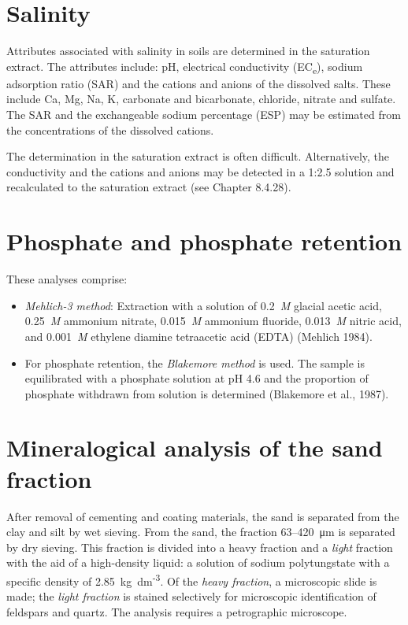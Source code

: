 \documentclass[
  letterpaper,
  DIV=11,
  numbers=noendperiod]{scrreprt}
\begin{document}
\hypertarget{salinity}{%
\section{Salinity}\label{salinity}}

Attributes associated with salinity in soils are determined in the
saturation extract. The attributes include: pH, electrical conductivity
(EC\textsubscript{e}), sodium adsorption ratio (SAR) and the cations and
anions of the dissolved salts. These include Ca, Mg, Na, K, carbonate
and bicarbonate, chloride, nitrate and sulfate. The SAR and the
exchangeable sodium percentage (ESP) may be estimated from the
concentrations of the dissolved cations.

The determination in the saturation extract is often difficult.
Alternatively, the conductivity and the cations and anions may be
detected in a 1:2.5 solution and recalculated to the saturation extract
(see Chapter 8.4.28).

\hypertarget{phosphate-and-phosphate-retention}{%
\section{Phosphate and phosphate
retention}\label{phosphate-and-phosphate-retention}}

These analyses comprise:

\begin{itemize}
\item
  \emph{Mehlich-3 method}: Extraction with a solution of 0.2~\emph{M}
  glacial acetic acid, 0.25~\emph{M} ammonium nitrate, 0.015~\emph{M}
  ammonium fluoride, 0.013~\emph{M} nitric acid, and 0.001~\emph{M}
  ethylene diamine tetraacetic acid (EDTA) (Mehlich 1984).
\item
  For phosphate retention, the \emph{Blakemore method} is used. The
  sample is equilibrated with a phosphate solution at pH 4.6 and the
  proportion of phosphate withdrawn from solution is determined
  (Blakemore et al., 1987).
\end{itemize}

\hypertarget{mineralogical-analysis-of-the-sand-fraction}{%
\section{Mineralogical analysis of the sand
fraction}\label{mineralogical-analysis-of-the-sand-fraction}}

After removal of cementing and coating materials, the sand is separated
from the clay and silt by wet sieving. From the sand, the fraction
63--420~μm is separated by dry sieving. This fraction is divided into a
heavy fraction and a \emph{light} fraction with the aid of a
high-density liquid: a solution of sodium polytungstate with a specific
density of 2.85~kg~dm\textsuperscript{-3}. Of the \emph{heavy fraction},
a microscopic slide is made; the \emph{light fraction} is stained
selectively for microscopic identification of feldspars and quartz. The
analysis requires a petrographic microscope.
\end{document}
